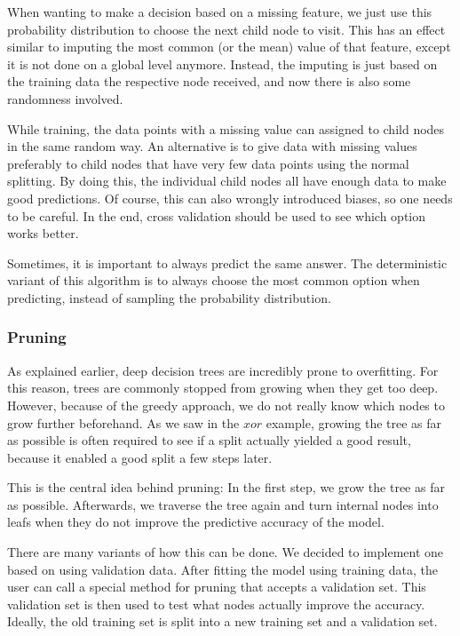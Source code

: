 \documentclass[a4paper]{article}
\begin{document}
When wanting to make a decision based on a missing feature, we just use this probability distribution to choose the next child node to visit. This has an effect similar to imputing the most common (or the mean) value of that feature, except it is not done on a global level anymore. Instead, the imputing is just based on the training data the respective node received, and now there is also some randomness involved.

While training, the data points with a missing value can assigned to child nodes in the same random way. An alternative is to give data with missing values preferably to child nodes that have very few data points using the normal splitting. By doing this, the individual child nodes all have enough data to make good predictions. Of course, this can also wrongly introduced biases, so one needs to be careful. In the end, cross validation should be used to see which option works better.

Sometimes, it is important to always predict the same answer. The deterministic variant of this algorithm is to always choose the most common option when predicting, instead of sampling the probability distribution.

\subsubsection{Pruning}

As explained earlier, deep decision trees are incredibly prone to overfitting. For this reason, trees are commonly stopped from growing when they get too deep. However, because of the greedy approach, we do not really know which nodes to grow further beforehand. As we saw in the $\mathit{xor}$ example, growing the tree as far as possible is often required to see if a split actually yielded a good result, because it enabled a good split a few steps later.

This is the central idea behind pruning: In the first step, we grow the tree as far as possible. Afterwards, we traverse the tree again and turn internal nodes into leafs when they do not improve the predictive accuracy of the model.

There are many variants of how this can be done. We decided to implement one based on using validation data. After fitting the model using training data, the user can call a special method for pruning that accepts a validation set. This validation set is then used to test what nodes actually improve the accuracy. Ideally, the old training set is split into a new training set and a validation set.
\end{document}

